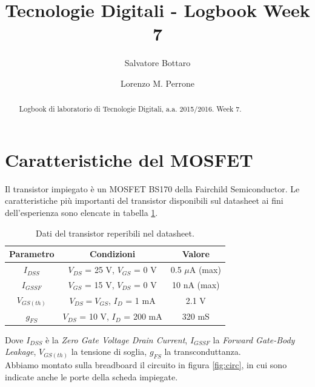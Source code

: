 \documentclass[journal, a4paper]{IEEEtran}
\begin{document}
	\title{Tecnologie Digitali - Logbook Week 7}
	\author[1]{Salvatore Bottaro}
		\author[2]{Lorenzo M. Perrone}
	\maketitle
	
\begin{abstract}
	Logbook di laboratorio di Tecnologie Digitali, a.a. 2015/2016. Week 7.
\end{abstract}

\section{Caratteristiche del MOSFET}

Il transistor impiegato è un MOSFET BS170 della Fairchild Semiconductor. Le caratteristiche più importanti del transistor disponibili sul datasheet ai fini dell'esperienza sono elencate in tabella \ref{tab:data}.

\begin{table}[htp]
\centering
\caption{Dati del transistor reperibili nel datasheet.}
\label{tab:data}
\begin{tabular}{|c|c|c|}
\hline 
Parametro & Condizioni & Valore \\ 
\hline 
$I_{DSS}$ & $V_{DS}$ = 25 V, $V_{GS}$ = 0 V & 0.5 $\mu$A (max) \\ 
\hline 
$I_{GSSF}$ & $V_{GS}$ = 15 V, $V_{DS}$ = 0 V & 10 nA (max)\\ 
\hline 
$V_{GS(th)}$ & $V_{DS} = V_{GS}$, $I_D$ = 1 mA & 2.1 V \\ 
\hline 
$g_{FS}$ & $V_{DS}$ = 10 V, $I_D$ = 200 mA & 320 mS \\ 
\hline 
\end{tabular} 
\end{table}

Dove $I_{DSS}$ è la \textit{Zero Gate Voltage Drain Current}, $I_{GSSF}$ la \textit{Forward Gate-Body Leakage}, $V_{GS(th)}$ la tensione di soglia, $g_{FS}$ la transconduttanza.\\
Abbiamo montato sulla breadboard il circuito in figura \ref{fig:circ}, in cui sono indicate anche le porte della scheda impiegate.
\end{document}
